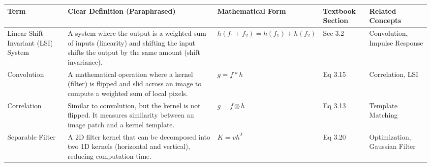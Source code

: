 \documentclass[12pt]{article}
\begin{document}
\begin{table}[h!]
    \centering
    \renewcommand{\arraystretch}{1.3}
    \begin{tabular}{|p{2.8cm}|p{4.2cm}|p{3cm}|p{2cm}|p{2.5cm}|}
        \hline
        \textbf{Term} & \textbf{Clear Definition (Paraphrased)}                                                                                                           & \textbf{Mathematical Form} & \textbf{Textbook Section} & \textbf{Related Concepts} \\
        \hline

        Linear Shift Invariant (LSI) System
                      & A system where the output is a weighted sum of inputs (linearity) and shifting the input shifts the output by the same amount (shift invariance).
                      & $h(f_1 + f_2) = h(f_1) + h(f_2)$
                      & Sec 3.2
                      & Convolution, Impulse Response                                                                                                                                                                                                          \\
        \hline

        Convolution
                      & A mathematical operation where a kernel (filter) is flipped and slid across an image to compute a weighted sum of local pixels.
                      & $g = f * h$
                      & Eq 3.15
                      & Correlation, LSI                                                                                                                                                                                                                       \\
        \hline

        Correlation
                      & Similar to convolution, but the kernel is not flipped. It measures similarity between an image patch and a kernel template.
                      & $g = f \otimes h$
                      & Eq 3.13
                      & Template Matching                                                                                                                                                                                                                      \\
        \hline

        Separable Filter
                      & A 2D filter kernel that can be decomposed into two 1D kernels (horizontal and vertical), reducing computation time.
                      & $K = v h^{T}$
                      & Eq 3.20
                      & Optimization, Gaussian Filter                                                                                                                                                                                                          \\
        \hline


\end{tabular}
\end{table}
\end{document}
